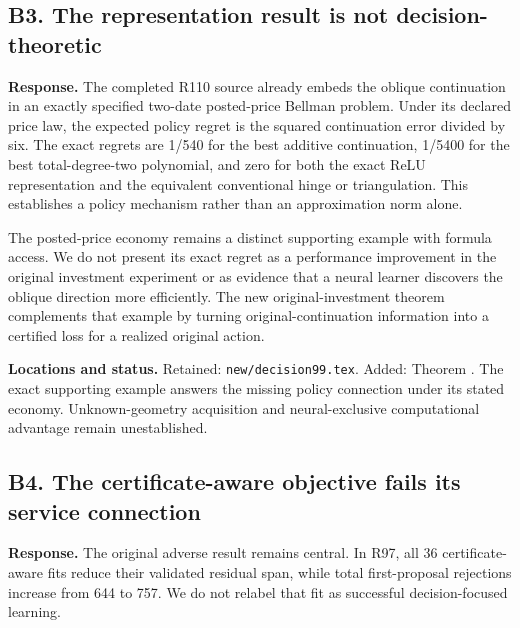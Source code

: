 \hypertarget{b3.-the-representation-result-is-not-decision-theoretic}{%
\subsection{B3. The representation result is not decision-theoretic}\label{b3.-the-representation-result-is-not-decision-theoretic}}

\textbf{Response.} The completed R110 source already embeds the oblique continuation in an exactly specified two-date posted-price Bellman problem. Under its declared price law, the expected policy regret is the squared continuation error divided by six. The exact regrets are 1/540 for the best additive continuation, 1/5400 for the best total-degree-two polynomial, and zero for both the exact ReLU representation and the equivalent conventional hinge or triangulation. This establishes a policy mechanism rather than an approximation norm alone.

The posted-price economy remains a distinct supporting example with formula access. We do not present its exact regret as a performance improvement in the original investment experiment or as evidence that a neural learner discovers the oblique direction more efficiently. The new original-investment theorem complements that example by turning original-continuation information into a certified loss for a realized original action.

\textbf{Locations and status.} Retained: \nolinkurl{new/decision99.tex}. Added: Theorem . The exact supporting example answers the missing policy connection under its stated economy. Unknown-geometry acquisition and neural-exclusive computational advantage remain unestablished.

\hypertarget{b4.-the-certificate-aware-objective-fails-its-service-connection}{%
\subsection{B4. The certificate-aware objective fails its service connection}\label{b4.-the-certificate-aware-objective-fails-its-service-connection}}

\textbf{Response.} The original adverse result remains central. In R97, all 36 certificate-aware fits reduce their validated residual span, while total first-proposal rejections increase from 644 to 757. We do not relabel that fit as successful decision-focused learning.

